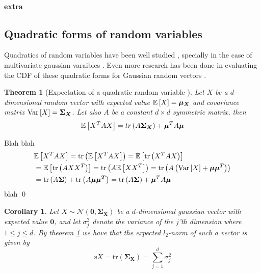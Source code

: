\documentclass[a4paper,12pt]{article}
\renewenvironment{proof}{{\textit{Proof} \\}}{\qed}
\newtheorem{theorem}{Theorem}
\newtheorem{corollary}{Corollary}[section]
\begin{document}
\paragraph{extra}


\subsection{Quadratic forms of random variables}
Quadratics of random variables have been well studied \cite{BatesQuadForm,MathaiQaudForms}, 
specially in the case of multivariate gaussian varaibles \cite{IowaQuadNormForms,MathaiQaudForms}.
Even more research has been done in evaluating the CDF of these quadratic forms
for Gaussian random vectors \cite{QuadFormsNume,QaudFormsBounds}.

\begin{theorem}[Expectation of a quadratic random variable \cite{BatesQuadForm}]
\label{theo:ExpQuad}
Let $X$ be a $d$-dimensional random vector with expected value $\mathbb{E} \left [ X  \right] =  \bm{\mu_{X}}$
and covariance matrix $\text{Var} \left [ X  \right] = \bm{\Sigma_{X}}$. Let also $A$ be a constant 
$d \times d$ symmetric matrix, then 
\[
    \mathbb{E} \left [ X^T A X  \right] = tr \left (A \bm{\Sigma_X}\right) + \bm{\mu}^T A\bm{\mu}
\]
\end{theorem}

\begin{proof}
Blah blah
\begin{align*}
    &\mathbb{E} \left [ X^T A X  \right] 
    =\text{tr}\left (\mathbb{E} \left [ X^T A X  \right]\right) 
    =\mathbb{E} \left [ \text{tr} \left (X^T A X\right)  \right] \\
    &= \mathbb{E} \left [ \text{tr} \left (A X X^T\right)  \right]
    = \text{tr} \left (A \mathbb{E} \left [ X X^T  \right]\right) 
    = \text{tr} \left (A \left ( \text{Var} \left [ X  \right] + \bm{\mu} \bm{\mu}^T\right)\right) \\
    &= \text{tr} \left (A \bm{\Sigma}\right) + \text{tr} \left (A \bm{\mu \mu^T}\right)
    = \text{tr} \left (A \bm{\Sigma}\right) + \bm{\mu}^T A \bm{\mu}
\end{align*}
blah
\end{proof}
\begin{corollary}
\label{cor:expNorm}
Let $X \sim \mathcal{N}(\bm{0}, \bm{\Sigma_X})$ be a $d$-dimensional gaussian vector
with expected value $\bm{0}$, and let $\sigma_j^2$ denote the variance of the 
$j$'th dimension where $1 \le j \le d$.
By theorem \ref{theo:ExpQuad} we have that the expected $l_2$-norm 
of such a vector is given by
\[
    \ee{X} = \text{tr} (\bm{\Sigma_X}) = \sum_{j=1}^d \sigma_j^2
\]
\end{corollary}
\end{document}
